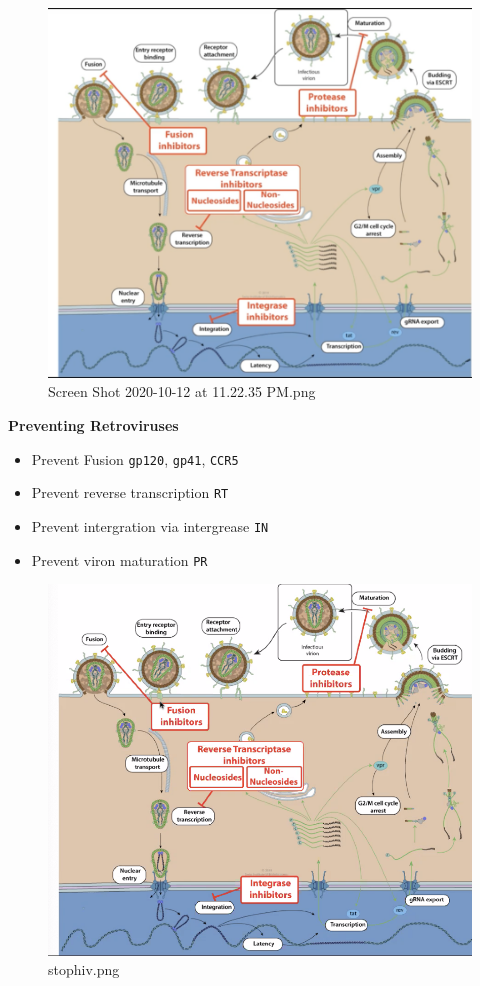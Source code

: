 \documentclass[letterpaper]{article}
\begin{document}
\begin{enumerate}
\begin{figure}[htbp]
\centering
\includegraphics[width=.9\linewidth]{Screen Shot 2020-10-12 at 11.22.35 PM.png}
\caption{Screen Shot 2020-10-12 at 11.22.35 PM.png}
\end{figure}

\textbf{Preventing Retroviruses}

\begin{itemize}
\item Prevent Fusion \texttt{gp120}, \texttt{gp41}, \texttt{CCR5}
\item Prevent reverse transcription \texttt{RT}
\item Prevent intergration via intergrease \texttt{IN}
\item Prevent viron maturation \texttt{PR}
\end{itemize}

\begin{figure}[htbp]
\centering
\includegraphics[width=.9\linewidth]{stophiv.png}
\caption{stophiv.png}
\end{figure}


\end{enumerate}
\end{document}
